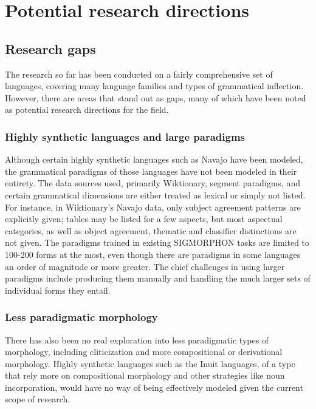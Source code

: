 \chapter{Potential research directions}

\section{Research gaps}

The research so far has been conducted on a fairly comprehensive set of languages, covering many language families and types of grammatical inflection. However, there are areas that stand out as gaps, many of which have been noted as potential research directions for the field. 

\subsection{Highly synthetic languages and large paradigms}

Although certain highly synthetic languages such as Navajo have been modeled, the grammatical paradigms of those languages have not been modeled in their entirety. The data sources used, primarily Wiktionary, segment paradigms, and certain grammatical dimensions are either treated as lexical or simply not listed. For instance, in Wiktionary's Navajo data, only subject agreement patterns are explicitly given; tables may be listed for a few aspects, but most aspectual categories, as well as object agreement, thematic and classifier distinctions are not given. The paradigms trained in existing SIGMORPHON tasks are limited to 100-200 forms at the most, even though there are paradigms in some languages an order of magnitude or more greater. The chief challenges in using larger paradigms include producing them manually and handling the much larger sets of individual forms they entail. 

\subsection{Less paradigmatic morphology}

There has also been no real exploration into less paradigmatic types of morphology, including cliticization and more compositional or derivational morphology. Highly synthetic languages such as the Inuit languages, of a type that rely more on compositional morphology and other strategies like noun incorporation, would have no way of being effectively modeled given the current scope of research.

